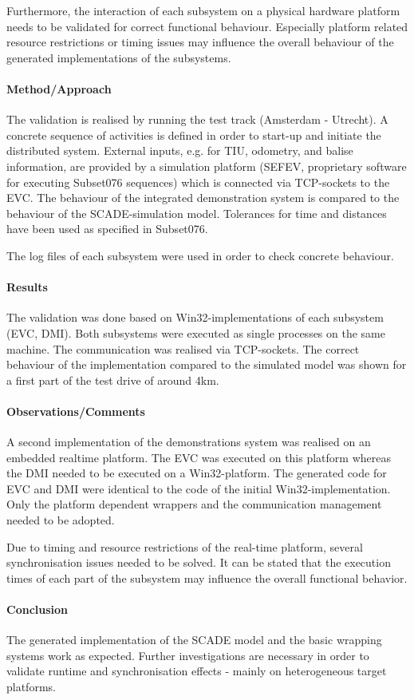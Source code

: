Furthermore, the interaction of each subsystem on a physical hardware
platform needs to be validated for correct functional
behaviour. Especially platform related resource restrictions or timing
issues may influence the overall behaviour of the generated
implementations of the subsystems.


\paragraph{Method/Approach}
The validation is realised by running the test track (Amsterdam -
Utrecht). A concrete sequence of activities is defined in order to
start-up and initiate the distributed system. External inputs,
e.g. for TIU, odometry, and balise information, are provided by a
simulation platform (SEFEV, proprietary software for executing
Subset076 sequences) which is connected via TCP-sockets to the
EVC. The behaviour of the integrated demonstration system is compared
to the behaviour of the SCADE-simulation model. Tolerances for time
and distances have been used as specified in Subset076.

The log files of each subsystem were used in order to check concrete behaviour.


\paragraph{Results}
The validation was done based on Win32-implementations of each
subsystem (EVC, DMI). Both subsystems were executed as single
processes on the same machine. The communication was realised via
TCP-sockets. The correct behaviour of the implementation compared to
the simulated model was shown for a first part of the test drive of
around 4km.


\paragraph{Observations/Comments}
A second implementation of the demonstrations system was realised on
an embedded realtime platform. The EVC was executed on this platform
whereas the DMI needed to be executed on a Win32-platform. The
generated code for EVC and DMI were identical to the code of the
initial Win32-implementation. Only the platform dependent wrappers and
the communication management needed to be adopted.

Due to timing and resource restrictions of the real-time platform,
several synchronisation issues needed to be solved. It can be stated
that the execution times of each part of the subsystem may influence
the overall functional behavior.


\paragraph{Conclusion}
The generated implementation of the SCADE model and the basic wrapping
systems work as expected. Further investigations are necessary in
order to validate runtime and synchronisation effects - mainly on
heterogeneous target platforms.
